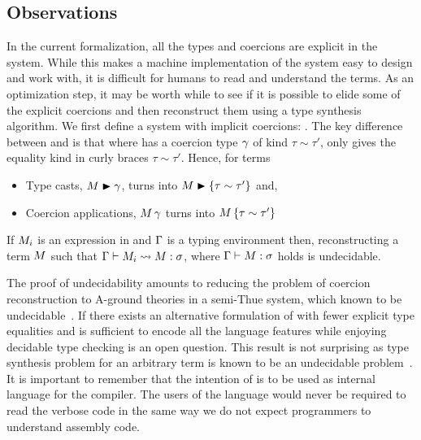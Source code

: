 \documentclass[screen,nonacm,manuscript,review]{acmart} %
\begin{document}
\subsection{Observations}
In the current formalization, all the types and coercions are explicit
in the system. While this makes a machine implementation of the system easy
to design and work with, it is difficult for humans to read
and understand the \SFC terms. As an optimization step,
it may be worth while to see if it is possible to elide some of the
explicit coercions and then reconstruct them using a type synthesis
algorithm. We first define a system with implicit coercions: \SFCi.
The key difference between \SFC and \SFCi is that where \SFC has a
coercion type $\gamma$ of kind $\tau\sim\tau'$, \SFCi only gives the
equality kind in curly braces $\tau\sim\tau'$.
Hence, for terms
\begin{itemize}
\item Type casts, $M\mathrel{\blacktriangleright}\gamma$, turns into $M\mathrel{\blacktriangleright}\{\tau \sim \tau'\}$ and,
\item Coercion applications, $M\,\gamma$ turns into $M\,\{\tau \sim \tau'\}$
\end{itemize}
\begin{theorem}
 If $M_i$ is an expression in \SFCi and $\Gamma$ is a typing
 environment then, reconstructing a \SFC term $M$
 such that $\Gamma \vdash M_i \rightsquigarrow M : \sigma$, where
 $\Gamma \vdash M : \sigma$ holds is undecidable.
\end{theorem}
The proof of undecidability amounts to reducing the problem of
coercion reconstruction to A-ground theories in a
semi-Thue system, which known to be
undecidable~\cite{post_recursive_1947}.
If there exists an alternative formulation of \SFCi with fewer
explicit type equalities and is sufficient to encode all the language
features while enjoying decidable type checking is an open question.
This result is not surprising as type synthesis problem for an
arbitrary \SF term is known to be an undecidable
problem~\cite{wells_typability_1999}. It is important to remember that
the intention of \SFC is to be used as internal language for the
compiler. The users of the language would never be required to read
the verbose code in the same way we do not expect programmers to
understand assembly code.
\end{document}
